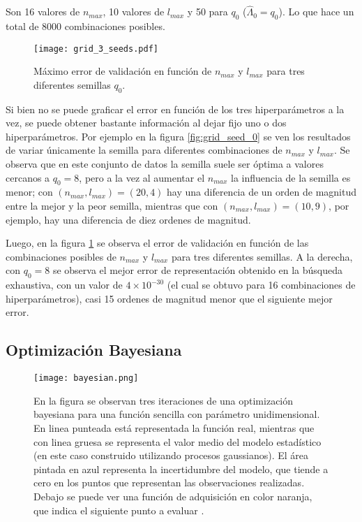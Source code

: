 Son 16 valores de $n_{max}$, 10 valores de $l_{max}$ y 50 para $q_0$ ($\hat{\Lambda}_0 = q_0$). Lo que hace un total de 8000 combinaciones posibles.



\begin{figure}[h!]
\centering
\texttt{[image: grid\_3\_seeds.pdf]}
\caption{Máximo error de validación en función de $n_{max}$ y $l_{max}$ para tres diferentes semillas $q_0$. }
\label{fig:grid_3_seeds}
\end{figure}

Si bien no se puede graficar el error en función de los tres hiperparámetros a la vez, se puede obtener bastante información al dejar fijo uno o dos hiperparámetros. Por ejemplo en la figura \ref{fig:grid_seed_0} se ven los resultados de variar únicamente la semilla para diferentes combinaciones de $n_{max}$ y $l_{max}$. Se observa que en este conjunto de datos la semilla suele ser óptima a valores cercanos a $q_0 = 8$, pero a la vez al aumentar el $n_{max}$ la influencia de la semilla es menor; con $(n_{max}, l_{max})=(20, 4)$ hay una diferencia de un orden de magnitud entre la mejor y la peor semilla, mientras que con $(n_{max}, l_{max})=(10, 9)$, por ejemplo, hay una diferencia de diez ordenes de magnitud.

Luego, en la figura \ref{fig:grid_3_seeds} se observa el error de validación en función de las combinaciones posibles de  $n_{max}$ y $l_{max}$ para tres diferentes semillas. A la derecha, con $q_0=8$ se observa el mejor error de representación obtenido en la búsqueda exhaustiva, con un valor de $4\times10^{-30}$ (el cual se obtuvo para 16 combinaciones de hiperparámetros), casi 15 ordenes de magnitud menor que el siguiente mejor error.


\subsection{Optimización Bayesiana}

\begin{figure}[h!]
\centering
\texttt{[image: bayesian.png]}
\caption{En la figura se observan tres iteraciones de una optimización bayesiana para una función sencilla con parámetro unidimensional. En linea punteada está representada la función real, mientras que con linea gruesa se representa el valor medio del modelo estadístico (en este caso construido utilizando procesos gaussianos). El área pintada en azul representa la incertidumbre del modelo, que tiende a cero en los puntos que representan las observaciones realizadas. Debajo se puede ver una función de adquisición en color naranja, que indica el siguiente punto a evaluar \cite{Feurer2019}.}
\label{fig:bayesian}
\end{figure}

